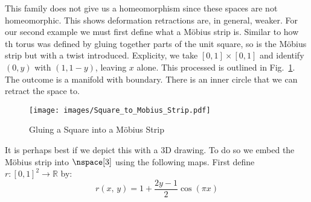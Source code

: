 \documentclass{book}                                                           %
\begin{document}
                \par
                \begin{minipage}[t]{0.54\textwidth}
                    This family does not give us a homeomorphism since these
                    spaces are not homeomorphic. This shows deformation
                    retractions are, in general, weaker. For our second example
                    we must first define what a M\"{o}bius strip is. Similar to
                    how th torus was defined by gluing together parts
                    of the unit square, so is the M\"{o}bius strip but with a
                    twist introduced. Explicity, we take $[0,1]\times[0,1]$ and
                    identify $(0,y)$ with $(1,1-y)$, leaving $x$ alone. This
                    processed is outlined in
                    Fig.~\ref{fig:Square_to_Mobius_Strip}. The outcome is a
                    manifold with boundary. There is an inner circle that we can
                    retract the space to.
                \end{minipage}
                \hfill
                \par\vspace{2.5ex}
                \begin{figure}
                    \centering
                    \captionsetup{type=figure}
                    \texttt{[image: images/Square\_to\_Mobius\_Strip.pdf]}
                    \caption{Gluing a Square into a M\"{o}bius Strip}
                    \label{fig:Square_to_Mobius_Strip}
                \end{figure}
                It is perhaps best if we depict this with a 3D drawing. To do so
                we embed the M\"{o}bius strip into $\nspace[3]$ using the
                following maps. First define $r:[0,1]^{2}\rightarrow\mathbb{R}$
                by:
                \begin{equation}
                    r(x,\,y)=1+\frac{2y-1}{2}\cos(\pi{x})
                \end{equation}
\end{document}
